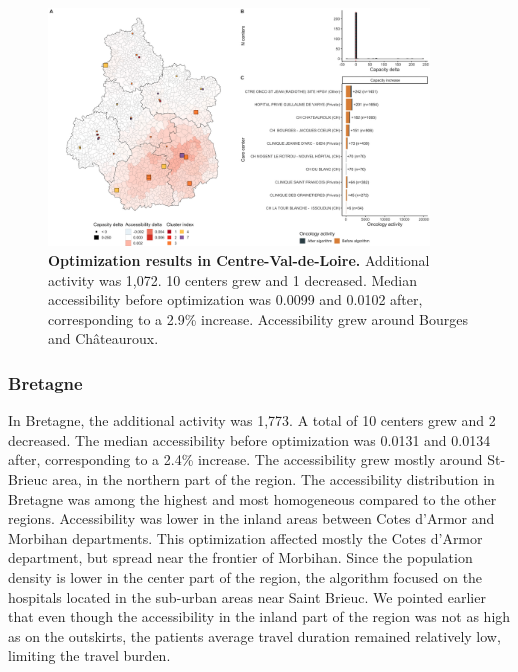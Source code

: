\begin{figure}[h!]
    \includegraphics[width=0.9\textwidth]{images/camion/optim_region/optim_Centre-Val-de-Loire.png}
    \centering
    \caption{ \textbf{Optimization results in Centre-Val-de-Loire.} Additional
        activity was 1,072. 10 centers grew and 1 decreased. Median
        accessibility before optimization was 0.0099 and 0.0102 after,
        corresponding to a 2.9\% increase. Accessibility grew around
        Bourges and Châteauroux. }
\end{figure}

\subsubsection{Bretagne}

In Bretagne, the additional activity was 1,773. A total of 10 centers grew and
2 decreased. The median accessibility before optimization was 0.0131 and 0.0134 after,
corresponding to a 2.4\% increase. The accessibility grew mostly around St-Brieuc area,
in the northern part of the region. The accessibility distribution in Bretagne
was among the highest and most homogeneous compared to the other regions.
Accessibility was lower in the inland areas between Cotes d'Armor and Morbihan
departments. This optimization affected mostly the Cotes d'Armor department, but
spread near the frontier of Morbihan. Since the population density is lower in
the center part of the region, the algorithm focused on the hospitals located
in the sub-urban areas near Saint Brieuc. We pointed earlier that even though
the accessibility in the inland part of the region was not as high as on the
outskirts, the patients average travel duration remained relatively low,
limiting the travel burden.

